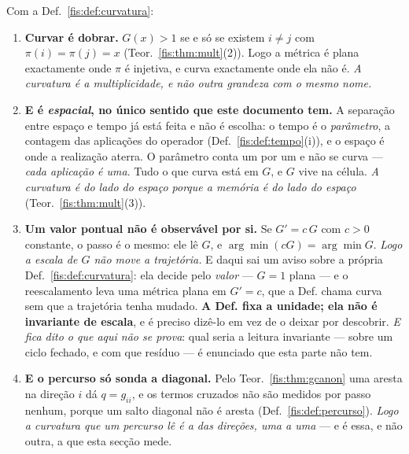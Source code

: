 \documentclass[livro.tex]{subfiles}
\begin{document}
\begin{teorema}\label{fis:thm:curvatura}
Com a Def.~\ref{fis:def:curvatura}:
\begin{enumerate}\itemsep3pt
\item[(1)] \textbf{Curvar é dobrar.} $G(x)>1$ se e só se existem $i\neq j$ com
$\pi(i)=\pi(j)=x$ (Teor.~\ref{fis:thm:mult}(2)). Logo a métrica é plana
exactamente onde $\pi$ é injetiva, e curva exactamente onde ela não é.
\emph{A curvatura é a multiplicidade, e não outra grandeza com o mesmo nome.}
\item[(2)] \textbf{E é \emph{espacial}, no único sentido que este documento
tem.} A separação entre espaço e tempo já está feita e não é escolha: o tempo é o
\emph{parâmetro}, a contagem das aplicações do operador
(Def.~\ref{fis:def:tempo}(i)), e o espaço é onde a realização aterra. O parâmetro
conta um por um e não se curva --- \emph{cada aplicação é uma}. Tudo o que curva
está em $G$, e $G$ vive na célula. \emph{A curvatura é do lado do espaço porque a
memória é do lado do espaço} (Teor.~\ref{fis:thm:mult}(3)).
\item[(3)] \textbf{Um valor pontual não é observável por si.} Se $G'=c\,G$ com
$c>0$ constante, o passo é o mesmo: ele lê $G$, e $\arg\min(cG)=\arg\min G$.
\emph{Logo a escala de $G$ não move a trajetória.} E daqui sai um aviso sobre a
própria Def.~\ref{fis:def:curvatura}: ela decide pelo \emph{valor} --- $G=1$
plana --- e o reescalamento leva uma métrica plana em $G'= c$, que a Def.
chama curva sem que a trajetória tenha mudado. \textbf{A Def. fixa a unidade; ela
não é invariante de escala}, e é preciso dizê-lo em vez de o deixar por
descobrir. \emph{E fica dito o que aqui não se prova}: qual seria a leitura
invariante --- sobre um ciclo fechado, e com que resíduo --- é enunciado que esta
parte não tem.
\item[(4)] \textbf{E o percurso só sonda a diagonal.} Pelo
Teor.~\ref{fis:thm:gcanon} uma aresta na direção $i$ dá $q=g_{ii}$, e os termos
cruzados não são medidos por passo nenhum, porque um salto diagonal não é aresta
(Def.~\ref{fis:def:percurso}). \emph{Logo a curvatura que um percurso lê é a das
direções, uma a uma} --- e é essa, e não outra, a que esta secção mede.
\end{enumerate}
\end{teorema}
\end{document}
